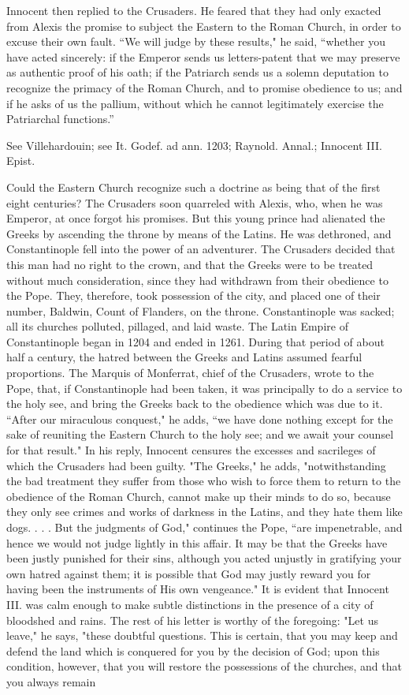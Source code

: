 Innocent then replied to the Crusaders. He feared that they had only exacted from Alexis the promise to subject the Eastern to the Roman Church, in order to excuse their own fault. “We will judge by these results," he said, “whether you have acted sincerely: if the Emperor sends us letters-patent that we may preserve as authentic proof of his oath; if the Patriarch sends us a solemn deputation to recognize the primacy of the Roman Church, and to promise obedience to us; and if he asks of us the pallium, without which he cannot legitimately exercise the Patriarchal functions.”

See Villehardouin; see It. Godef. ad ann. 1203; Raynold. Annal.; Innocent III. Epist.

Could the Eastern Church recognize such a doctrine as being that of the first eight centuries? The Crusaders soon quarreled with Alexis, who, when he was Emperor, at once forgot his promises. But this young prince had alienated the Greeks by ascending the throne by means of the Latins. He was dethroned, and Constantinople fell into the power of an adventurer. The Crusaders decided that this man had no right to the crown, and that the Greeks were to be treated without much consideration, since they had withdrawn from their obedience to the Pope. They, therefore, took possession of the city, and placed one of their number, Baldwin, Count of Flanders, on the throne. Constantinople was sacked; all its churches polluted, pillaged, and laid waste. The Latin Empire of Constantinople began in 1204 and ended in 1261. During that period of about half a century, the hatred between the Greeks and Latins assumed fearful proportions. The Marquis of Monferrat, chief of the Crusaders, wrote to the Pope, that, if Constantinople had been taken, it was principally to do a service to the holy see, and bring the Greeks back to the obedience which was due to it. “After our miraculous conquest," he adds, “we have done nothing except for the sake of reuniting the Eastern Church to the holy see; and we await your counsel for that result." In his reply, Innocent censures the excesses and sacrileges of which the Crusaders had been guilty. "The Greeks," he adds, "notwithstanding the bad treatment they suffer from those who wish to force them to return to the obedience of the Roman Church, cannot make up their minds to do so, because they only see crimes and works of darkness in the Latins, and they hate them like dogs. . . . But the judgments of God," continues the Pope, “are impenetrable, and hence we would not judge lightly in this affair. It may be that the Greeks have been justly punished for their sins, although you acted unjustly in gratifying your own hatred against them; it is possible that God may justly reward you for having been the instruments of His own vengeance." It is evident that Innocent III. was calm enough to make subtle distinctions in the presence of a city of bloodshed and rains. The rest of his letter is worthy of the foregoing: "Let us leave," he says, "these doubtful questions. This is certain, that you may keep and defend the land which is conquered for you by the decision of God; upon this condition, however, that you will restore the possessions of the churches, and that you always remain 